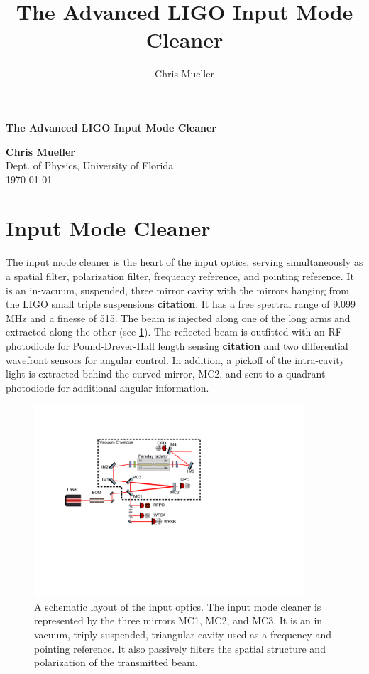 \documentclass[10pt]{article}
\title{The Advanced LIGO Input Mode Cleaner}
\author{Chris Mueller}
\begin{document}
\begin{large}
\begin{center}
\begin{LARGE}
\textbf{The Advanced LIGO Input Mode Cleaner}\\
\end{LARGE}
\vspace{0.50in}
\textbf{Chris Mueller} \\
Dept. of Physics, University of Florida\\
\today
\end{center}
\end{large}
\vspace{1pc}
\tableofcontents
\pagebreak[4]

\section{Input Mode Cleaner}

The input mode cleaner is the heart of the input optics, serving simultaneously as a spatial filter, 
polarization filter, frequency reference, and pointing reference.  
It is an in-vacuum, suspended, three mirror cavity with the mirrors hanging from the LIGO small triple 
suspensions \textbf{citation}.  
It has a free spectral range of 9.099 MHz and a finesse of 515.  
The beam is injected along one of the long arms and extracted along the other (see \ref{fig:ioAll}).  
The reflected beam is outfitted with an RF photodiode for Pound-Drever-Hall length sensing \textbf{citation} 
and two differential wavefront sensors for angular control.  
In addition, a pickoff of the intra-cavity light is extracted behind the curved mirror, MC2, and sent to a 
quadrant photodiode for additional angular information.  

\begin{figure}
	\centering
	\includegraphics[width=0.9\textwidth, trim=3.5cm 7.5cm 11cm 3.5cm]{IO_Drawing.pdf}
	\caption{A schematic layout of the input optics.  
		The input mode cleaner is represented by the three mirrors MC1, MC2, and MC3.  
		It is an in vacuum, triply suspended, triangular cavity used as a frequency 
		and pointing reference.  It also passively filters the spatial structure 
		and polarization of the transmitted beam.}
	\label{fig:ioAll}
\end{figure}		
\end{document}
